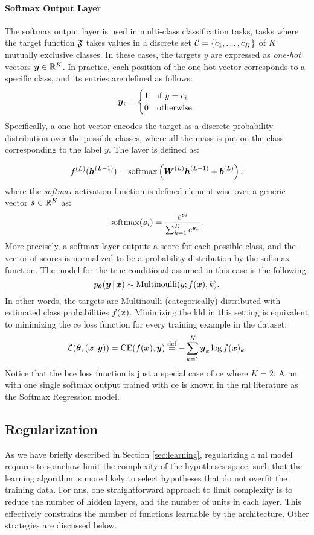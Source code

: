 \paragraph{Softmax Output Layer}
The softmax output layer is used in multi-class classification tasks, \ie tasks where the target function $\mathfrak{F}$ takes values in a discrete set $\Cal{C} = \Set{c_1, \ldots, c_K}$ of $K$ mutually exclusive classes. In these cases, the targets $y$ are expressed as \emph{one-hot} vectors $\Vector{y} \in \Real^K$. In practice, each position of the one-hot vector corresponds to a specific class, and its entries are defined as follows:
\begin{align*}
    \Vector{y}_i=
    \begin{cases}
        1 & \mathrm{if}\; y = c_i\\
        0 & \mathrm{otherwise}.
    \end{cases}
\end{align*}
Specifically, a one-hot vector encodes the target as a discrete probability distribution over the possible classes, where all the mass is put on the class corresponding to the label $y$. The layer is defined as:

$$\Layer{f}{L}(\LayerVector{h}{L-1}) = \softmax \Par{\LayerMatrix{W}{L} \LayerVector{h}{L-1} + \LayerVector{b}{L}},$$
where the \emph{softmax} activation function is defined element-wise over a generic vector $\Vector{s} \in \Real^K$ as:
$$\softmax(\Vector{s}_i) = \frac{e^{\Vector{s}_i}}{\sum_{k=1}^K e^{\Vector{s}_k}}.$$
More precisely, a softmax layer outputs a score for each possible class, and the vector of scores is normalized to be a probability distribution by the softmax function. The model for the true conditional assumed in this case is the following:
$$p_{\Param}(\Vector{y} \given \Vector{x}) \sim \Fun{Multinoulli}(y; f(\Vector{x}), k).$$
In other words, the targets are Multinoulli (categorically) distributed with estimated class probabilities $f(\Vector{x})$. Minimizing the \gls{kld} in this setting is equivalent to minimizing the \gls{ce} loss function for every training example in the dataset:
$$\Loss(\Param, (\Vector{x}, \Vector{y})) = \mathrm{CE}(f(\Vector{x}), \Vector{y}) \defeq - \sum_{k=1}^K \Vector{y}_k \log f(\Vector{x})_k.$$
Notice that the \gls{bce} loss function is just a special case of \gls{ce} where $K = 2$. A \gls{nn} with one single softmax output trained with \gls{ce} is known in the \gls{ml} literature as the Softmax Regression model.

\subsection{Regularization}\label{sec:regularization}
As we have briefly described in Section \ref{sec:learning}, regularizing a \gls{ml} model requires to somehow limit the complexity of the hypotheses space, such that the learning algorithm is more likely to select hypotheses that do not overfit the training data. For \glspl{nn}, one straightforward approach to limit complexity is to reduce the number of hidden layers, and the number of units in each layer. This effectively constrains the number of functions learnable by the architecture. Other strategies are discussed below.

